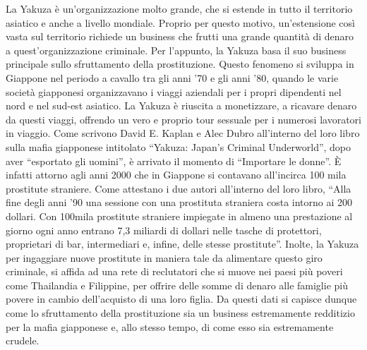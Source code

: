 \documentclass[a4paper, 11pt]{article}
\begin{document}

La Yakuza è un’organizzazione molto grande, che si estende in tutto il territorio asiatico e anche a livello mondiale. Proprio per questo motivo, un’estensione così vasta sul territorio richiede un business che frutti una grande quantità di denaro a quest’organizzazione criminale. Per l’appunto, la Yakuza basa il suo business principale sullo sfruttamento della prostituzione. Questo fenomeno si sviluppa in Giappone nel periodo a cavallo tra gli anni ’70 e gli anni ’80, quando le varie società giapponesi organizzavano i viaggi aziendali per i propri dipendenti nel nord e nel sud-est asiatico. La Yakuza è riuscita a monetizzare, a ricavare denaro da questi viaggi, offrendo un vero e proprio tour sessuale per i numerosi lavoratori in viaggio. Come scrivono David E. Kaplan e Alec Dubro all’interno del loro libro sulla mafia giapponese intitolato “Yakuza: Japan’s Criminal Underworld”, dopo aver “esportato gli uomini”, è arrivato il momento di “Importare le donne”. È infatti attorno agli anni 2000 che in Giappone si contavano all’incirca 100 mila prostitute straniere. Come attestano i due autori all’interno del loro libro, “Alla fine degli anni ’90 una sessione con una prostituta straniera costa intorno ai 200 dollari. Con 100mila prostitute straniere impiegate in almeno una prestazione al giorno ogni anno entrano 7,3 miliardi di dollari nelle tasche di protettori, proprietari di bar, intermediari e, infine, delle stesse prostitute”. Inolte, la Yakuza per ingaggiare nuove prostitute in maniera tale da alimentare questo giro criminale, si affida ad una rete di reclutatori che si muove nei paesi più poveri come Thailandia e Filippine, per offrire delle somme di denaro alle famiglie più povere in cambio dell’acquisto di una loro figlia. Da questi dati si capisce dunque come lo sfruttamento della prostituzione sia un business estremamente redditizio per la mafia giapponese e, allo stesso tempo, di come esso sia estremamente crudele.

\newpage
\end{document}
